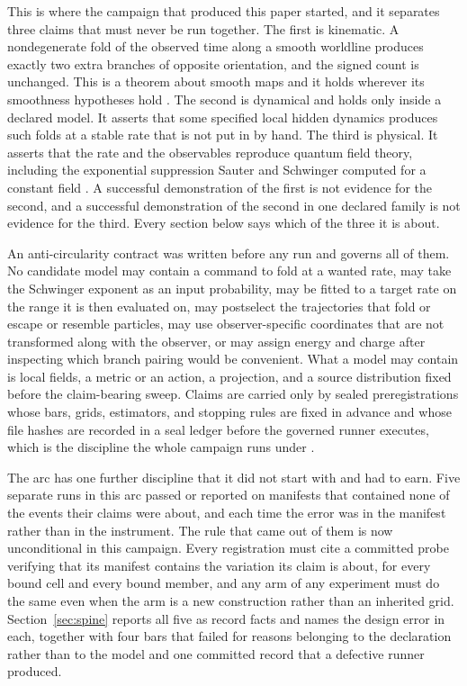 \documentclass[aps,pre,reprint,nofootinbib,floatfix]{revtex4-2}
\begin{document}
This is where the campaign that produced this paper started, and it
separates three claims that must never be run together.  The first is
kinematic.  A nondegenerate fold of the observed time along a smooth
worldline produces exactly two extra branches of opposite orientation,
and the signed count is unchanged.  This is a theorem about smooth maps
and it holds wherever its smoothness hypotheses hold
\cite{Whitney1955, ArnoldGZ}.  The second is dynamical and holds only
inside a declared model.  It asserts that some specified local hidden
dynamics produces such folds at a stable rate that is not put in by
hand.  The third is physical.  It asserts that the rate and the
observables reproduce quantum field theory, including the exponential
suppression Sauter and Schwinger computed for a constant field
\cite{Sauter1931, HeisenbergEuler1936, Schwinger1951, Dunne2004}.  A
successful demonstration of the first is not evidence for the second,
and a successful demonstration of the second in one declared family is
not evidence for the third.  Every section below says which of the
three it is about.

An anti-circularity contract was written before any run and governs all
of them.  No candidate model may contain a command to fold at a wanted
rate, may take the Schwinger exponent as an input probability, may be
fitted to a target rate on the range it is then evaluated on, may
postselect the trajectories that fold or escape or resemble particles,
may use observer-specific coordinates that are not transformed along
with the observer, or may assign energy and charge after inspecting
which branch pairing would be convenient.  What a model may contain is
local fields, a metric or an action, a projection, and a
source distribution fixed before the claim-bearing sweep.  Claims are
carried only by sealed preregistrations whose bars, grids, estimators,
and stopping rules are fixed in advance and whose file hashes are
recorded in a seal ledger before the governed runner executes, which is
the discipline the whole campaign runs under
\cite{ZenodoGames, ZenodoGen2, ZenodoCrypto}.

The arc has one further discipline that it did not start with and had
to earn.  Five separate runs in this arc passed or reported on manifests
that contained none of the events their claims were about, and each
time the error was in the manifest rather than in the instrument.  The
rule that came out of them is now unconditional in this campaign.  Every
registration must cite a committed probe verifying that its manifest
contains the variation its claim is about, for every bound cell and
every bound member, and any arm of any experiment must do the same
even when the arm is a new construction rather than an inherited grid.
Section~\ref{sec:spine} reports all five as record facts and names the
design error in each, together with four bars that failed for reasons
belonging to the declaration rather than to the model and one committed
record that a defective runner produced.
\end{document}
